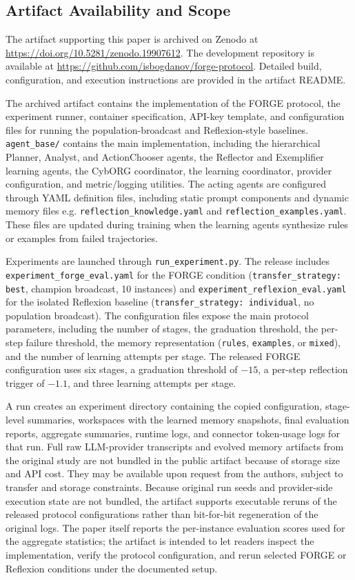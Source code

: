 \documentclass[sigconf]{acmart}
\begin{document}
\subsection{Artifact Availability and Scope}

The artifact supporting this paper is archived on Zenodo at
\url{https://doi.org/10.5281/zenodo.19907612}. The development repository is
available at \url{https://github.com/isbogdanov/forge-protocol}. Detailed
build, configuration, and execution instructions are provided in the artifact
README.

The archived artifact contains the implementation of the FORGE protocol, the
experiment runner, container specification, API-key template, and configuration
files for running the population-broadcast and Reflexion-style baselines. \texttt{agent\_base/} contains the main implementation, including the hierarchical
Planner, Analyst, and ActionChooser agents, the Reflector and Exemplifier
learning agents, the CybORG coordinator, the learning coordinator, provider
configuration, and metric/logging utilities. The acting agents are configured
through YAML definition files, including static prompt components and dynamic
memory files e.g. \texttt{reflection\_knowledge.yaml} and
\texttt{reflection\_examples.yaml}. These files are updated during training when
the learning agents synthesize rules or examples from failed trajectories.

Experiments are launched through \texttt{run\_experiment.py}. The release
includes \texttt{experiment\_forge\_eval.yaml} for the FORGE condition
(\texttt{transfer\_strategy: best}, champion broadcast, 10 instances) and
\texttt{experiment\_reflexion\_eval.yaml} for the isolated Reflexion baseline
(\texttt{transfer\_strategy: individual}, no population broadcast). The
configuration files expose the main protocol parameters, including the number
of stages, the graduation threshold, the per-step failure threshold, the memory
representation (\texttt{rules}, \texttt{examples}, or \texttt{mixed}), and the
number of learning attempts per stage. The released FORGE configuration uses
six stages, a graduation threshold of $-15$, a per-step reflection trigger of
$-1.1$, and three learning attempts per stage.

A run creates an experiment directory containing the copied configuration,
stage-level summaries, workspaces with the learned memory snapshots, final
evaluation reports, aggregate summaries, runtime logs, and connector token-usage
logs for that run. Full raw LLM-provider transcripts and evolved memory
artifacts from the original study are not bundled in the public artifact because
of storage size and API cost. They may be available upon request from the
authors, subject to transfer and storage constraints. Because original run seeds
and provider-side execution state are not bundled, the artifact supports
executable reruns of the released protocol configurations rather than
bit-for-bit regeneration of the original logs. The paper itself reports the
per-instance evaluation scores used for the aggregate statistics; the artifact
is intended to let readers inspect the implementation, verify the protocol
configuration, and rerun selected FORGE or Reflexion conditions under the
documented setup.
\end{document}

